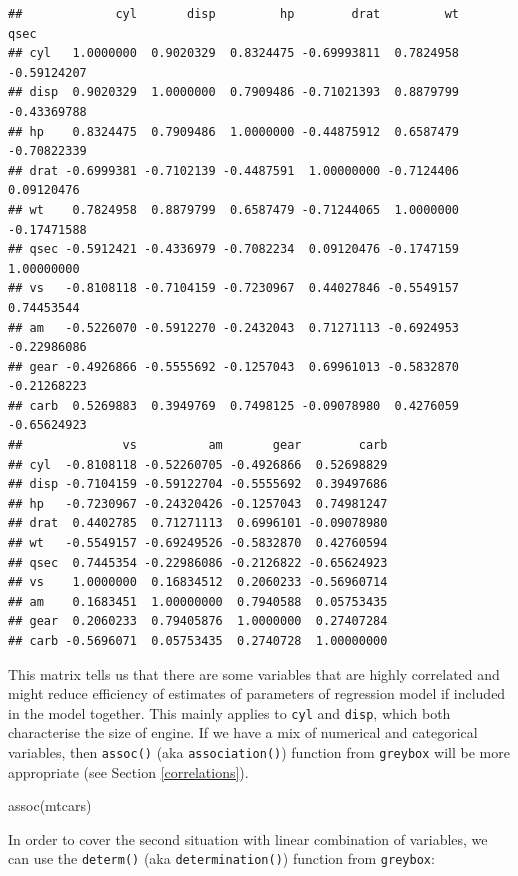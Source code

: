 \documentclass[
]{book}
\newenvironment{Shaded}{\begin{snugshade}}{\end{snugshade}}
\newcommand{\FunctionTok}[1]{\textcolor[rgb]{0.00,0.00,0.00}{#1}}
\newcommand{\NormalTok}[1]{#1}
\theoremstyle{definition}
\theoremstyle{definition}
\theoremstyle{definition}
\theoremstyle{definition}
\theoremstyle{remark}
\begin{document}
\begin{verbatim}
##             cyl       disp         hp        drat         wt        qsec
## cyl   1.0000000  0.9020329  0.8324475 -0.69993811  0.7824958 -0.59124207
## disp  0.9020329  1.0000000  0.7909486 -0.71021393  0.8879799 -0.43369788
## hp    0.8324475  0.7909486  1.0000000 -0.44875912  0.6587479 -0.70822339
## drat -0.6999381 -0.7102139 -0.4487591  1.00000000 -0.7124406  0.09120476
## wt    0.7824958  0.8879799  0.6587479 -0.71244065  1.0000000 -0.17471588
## qsec -0.5912421 -0.4336979 -0.7082234  0.09120476 -0.1747159  1.00000000
## vs   -0.8108118 -0.7104159 -0.7230967  0.44027846 -0.5549157  0.74453544
## am   -0.5226070 -0.5912270 -0.2432043  0.71271113 -0.6924953 -0.22986086
## gear -0.4926866 -0.5555692 -0.1257043  0.69961013 -0.5832870 -0.21268223
## carb  0.5269883  0.3949769  0.7498125 -0.09078980  0.4276059 -0.65624923
##              vs          am       gear        carb
## cyl  -0.8108118 -0.52260705 -0.4926866  0.52698829
## disp -0.7104159 -0.59122704 -0.5555692  0.39497686
## hp   -0.7230967 -0.24320426 -0.1257043  0.74981247
## drat  0.4402785  0.71271113  0.6996101 -0.09078980
## wt   -0.5549157 -0.69249526 -0.5832870  0.42760594
## qsec  0.7445354 -0.22986086 -0.2126822 -0.65624923
## vs    1.0000000  0.16834512  0.2060233 -0.56960714
## am    0.1683451  1.00000000  0.7940588  0.05753435
## gear  0.2060233  0.79405876  1.0000000  0.27407284
## carb -0.5696071  0.05753435  0.2740728  1.00000000
\end{verbatim}

This matrix tells us that there are some variables that are highly correlated and might reduce efficiency of estimates of parameters of regression model if included in the model together. This mainly applies to \texttt{cyl} and \texttt{disp}, which both characterise the size of engine. If we have a mix of numerical and categorical variables, then \texttt{assoc()} (aka \texttt{association()}) function from \texttt{greybox} will be more appropriate (see Section \ref{correlations}).

\begin{Shaded}
\begin{Highlighting}[]
\FunctionTok{assoc}\NormalTok{(mtcars)}
\end{Highlighting}
\end{Shaded}

In order to cover the second situation with linear combination of variables, we can use the \texttt{determ()} (aka \texttt{determination()}) function from \texttt{greybox}:
\end{document}
